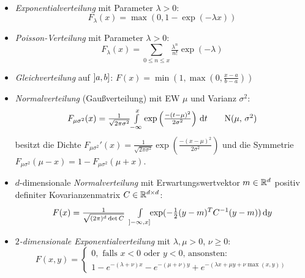 \documentclass{cheat-sheet}
\begin{document}
\begin{defn}\mbox{}\\
  \begin{itemize}
    \item \emph{Exponentialverteilung} mit Parameter $\lambda > 0$:
    \[ F_{\lambda}(x) = \max(0, 1 - \exp(- \lambda x)) \tag*{Exp($\lambda$)} \]
    \item \emph{Poisson-Verteilung} mit Parameter $\lambda > 0$:
    \[ F_{\lambda}(x) = \sum_{0 \leq n \leq x} \tfrac{\lambda^n}{n!} \exp(-\lambda) \tag*{Poi($\lambda$)} \]
    \item \emph{Gleichverteilung} auf $\left] a, b \right]$: $F(x) = \min(1, \max(0, \tfrac{x - a}{b - a}))$
    \item \emph{Normalverteilung} (Gaußverteilung) mit EW $\mu$ und Varianz $\sigma^2$:
    \[ F_{\mu \sigma^2}(x) = \tfrac{1}{\sqrt{2 \pi \sigma^2}} {\textstyle \int\limits_{-\infty}^{x}} \exp\left(\tfrac{-(t-\mu)^2}{2 \sigma^2}\right) \,\mathrm{d} t \tag*{N($\mu$, $\sigma^2$)} \]
    besitzt die Dichte $F_{\mu \sigma^2}'(x) = \tfrac{1}{\sqrt{2 \pi \sigma^2}} \exp\left(\tfrac{-(x-\mu)^2}{2 \sigma^2}\right)$ und die Symmetrie $F_{\mu \sigma^2}(\mu{-}x) = 1 - F_{\mu \sigma^2}(\mu{+}x)$.
    \item $d$-dimensionale \emph{Normalverteilung} mit Erwartungswertvektor $m \in \mathbb{R}^d$ positiv definiter Kovarianzenmatrix $C \in \mathbb{R}^{d \times d}$:
    \[ F(x) = \tfrac{1}{\sqrt{(2 \pi)^d \det C}} \enspace {\textstyle \int\limits_{\left] -\infty, x \right]}^{}} \!\! \exp(- \tfrac{1}{2} (y-m)^T C^{-1} (y-m)) \,\mathrm{d} y \]
    \item \emph{$2$-dimensionale Exponentialverteilung} mit $\lambda, \mu > 0$, $\nu \geq 0$:
    \[ F(x, y) = \begin{cases} 0, \text{ falls $x < 0$ oder $y < 0$, ansonsten:} \\ 1 - e^{-(\lambda {+} \nu) x} - e^{-(\mu {+} \nu) y} + e^{-(\lambda x {+} \mu y {+} \nu \max(x, y))} \end{cases} \]
  \end{itemize}
\end{defn}
\end{document}
